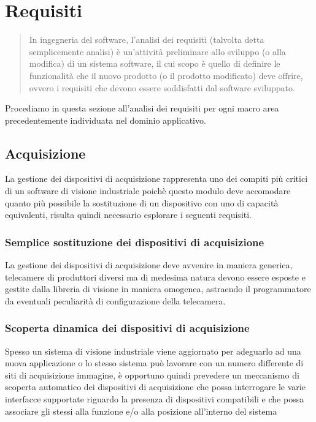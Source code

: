 \section{Requisiti}
\label{sec:requisiti}

\begin{quote}
\small
In ingegneria del software, l'analisi dei requisiti (talvolta detta semplicemente analisi) è un'attività preliminare allo sviluppo (o alla modifica) di un sistema software, il cui scopo è quello di definire le funzionalità che il nuovo prodotto (o il prodotto modificato) deve offrire, ovvero i requisiti che devono essere soddisfatti dal software sviluppato.\cite{requisiti}
\end{quote}

Procediamo in questa sezione all'analisi dei requisiti per ogni macro area precedentemente individuata nel dominio applicativo.

\subsection{Acquisizione}
La gestione dei dispositivi di acquisizione rappresenta uno dei compiti più critici di un software di visione industriale poichè
questo modulo deve accomodare quanto più possibile la sostituzione di un dispositivo con uno di capacità equivalenti, risulta quindi necessario esplorare i seguenti requisiti.

\subsubsection{Semplice sostituzione dei dispositivi di acquisizione}
La gestione dei dispositivi di acquisizione deve avvenire in maniera generica, telecamere di produttori diversi ma di medesima natura devono essere esposte e gestite dalla libreria di visione in maniera omogenea, astraendo il programmatore da eventuali peculiarità di configurazione della telecamera.
\subsubsection{Scoperta dinamica dei dispositivi di acquisizione}
Spesso un sistema di visione industriale viene aggiornato per adeguarlo ad una nuova applicazione o lo stesso sistema può lavorare con un numero differente di siti di acquisizione immagine, è opportuno quindi prevedere un meccanismo di scoperta automatico dei dispositivi di acquisizione che possa interrogare le varie interfacce supportate riguardo la presenza di dispositivi compatibili e che possa associare gli stessi alla funzione e/o alla posizione all'interno del sistema
